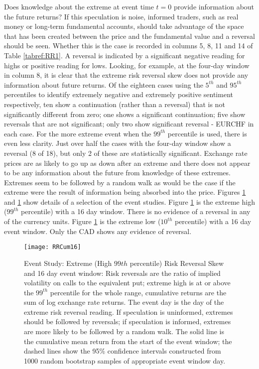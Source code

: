 \documentclass[ijfs,article,submit,oneauthor,pdftex,10pt,a4paper]{mdpi}
\begin{document}
{Does knowledge about the extreme at event time $t = 0$ provide information about the future returns?  If this speculation is noise, informed traders, such as real money or long-term fundamental accounts, should take advantage of the space that has been created between the price and the fundamental value and a reversal should be seen.  Whether this is the case is recorded in columns 5, 8, 11 and 14 of Table \ref{tabref:RR1}. A reversal is indicated by a significant negative reading for highs or positive reading for lows.   Looking, for example, at the four-day window in column 8, it is clear that the extreme risk reversal skew does not provide any information about future returns.  Of the eighteen cases using the $5^{th}$ and $95^{th}$ percentiles to identify extremely negative and extremely positive sentiment respectively, ten show a continuation (rather than a reversal) that is not significantly different from zero; one shows a significant continuation; five show reversals that are not significant; only two show significant reversal - EURCHF in each case.  For the more extreme event when the $99^{th}$ percentile is used, there is even less clarity.  Just over half the cases with the four-day window show a reversal (8 of 18), but only 2 of these are statistically significant. Exchange rate prices are as likely to go up as down after an extreme and there does not appear to be any information about the future from knowledge of these extremes. Extremes seem to be followed by a random walk as would be the case if the extreme were the result of information being absorbed into the price.  Figures \ref{fig:ES5} and \ref{fig:ES5} show details of a selection of the event studies.  Figure \ref{fig:ES5} is the extreme high ($99^{th}$ percentile) with a 16 day window. There is no evidence of a reversal in any of the currency units.   Figure \ref{fig:ES5} is the extreme low ($10^{th}$ percentile) with a 16 day event window.  Only the CAD shows any evidence of reversal. 

\begin{figure}
\graphicspath{{../Figures/}}
\centering
\texttt{[image: RRCum16]}
\caption{Event Study: Extreme (High $99{th}$ percentile) Risk Reversal Skew and 16 day event window: Risk reversals are the ratio of implied volatility on calls to the equivalent put; extreme high is at or above the $99^{th}$ percentile for the whole range, cumulative returns are the sum of log exchange rate returns. The event day is the day of the extreme risk reversal reading.  If speculation is uninformed, extremes should be followed by reversals; if speculation is informed, extremes are more likely to be followed by a random walk. The solid line is the cumulative mean return from the start of the event window; the dashed lines show the 95\% confidence intervals constructed from 1000 random bootstrap samples of appropriate event window day.}
\label{fig:ES5}
\end{figure}

}
\end{document}
